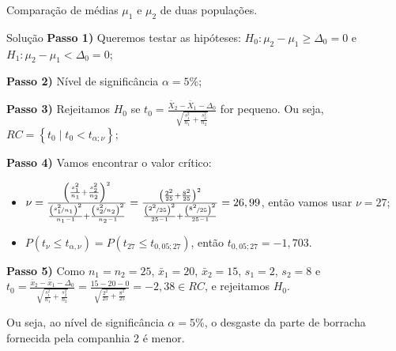\documentclass[9pt]{beamer}
\begin{document}
\begin{frame}{Comparação de médias $\mu_1$ e $\mu_2$ de duas populações.}

\small
\begin{block}{Solução}
	\textbf{Passo 1)} Queremos testar as hipóteses: $H_0: \mu_2 - \mu_1 \geq \Delta_0=0$ e $H_1: \mu_2 - \mu_1 < \Delta_0=0$;
	
	\textbf{Passo 2)} Nível de significância $\alpha=5\%$;
	
	\textbf{Passo 3)} Rejeitamos $H_0$ se $t_0=\frac{\bar{X}_2 - \bar{X}_1 - \Delta_0}{\sqrt{\frac{s_1^2}{n_1} + \frac{s_2^2}{n_2}}} $ for pequeno. Ou seja, $RC = \left\{ t_0 \mid t_0 < t_{\alpha; \nu} \right\}$;
	
	\textbf{Passo 4)} Vamos encontrar o valor crítico:
	\begin{itemize}
		\item $\nu = \frac{\left( \frac{s_1^2}{n_1} + \frac{s_2^2}{n_2} \right)^2}{\frac{\left(\nicefrac{s_1^2}{n_1}\right)^2}{n_1-1} + \frac{\left(\nicefrac{s_2^2}{n_2}\right)^2}{n_2-1}} = \frac{\left( \frac{2^2}{25} + \frac{8^2}{25} \right)^2}{\frac{\left(\nicefrac{2^2}{25}\right)^2}{25-1} + \frac{\left(\nicefrac{8^2}{25}\right)^2}{25-1}} = 26,99$, então vamos usar $\nu = 27$;
		\item $P(t_\nu \leq t_{\alpha, \nu}) = P(t_{27} \leq t_{0,05; 27})$, então $t_{0,05; 27} = -1,703$.
	\end{itemize}

	\textbf{Passo 5)} Como $n_1=n_2=25$, $\bar{x}_1=20$, $\bar{x}_2=15$, $s_1=2$, $s_2=8$ e $t_0 = \frac{\bar{x}_2 - \bar{x}_1- \Delta_0}{\sqrt{\frac{s_1^2}{n_1} + \frac{s_2^2}{n_2}}} = \frac{15 - 20  - 0}{\sqrt{\frac{2^2}{25} + \frac{8^2}{25}}}=-2,38 \in RC$, e rejeitamos $H_0$. 
	
	Ou seja, ao nível de significância $\alpha=5\%$, o desgaste da parte de borracha fornecida pela companhia 2 é menor.
\end{block}
\normalsize

\end{frame}
\end{document}
